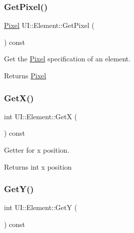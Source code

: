 \mbox{\label{classUI_1_1Element_a7137dc641804612162488d32a147c229}} 
\subsubsection{\texorpdfstring{Get\+Pixel()}{GetPixel()}}
{\footnotesize\ttfamily \hyperlink{classUI_1_1Pixel}{Pixel} U\+I\+::\+Element\+::\+Get\+Pixel (\begin{DoxyParamCaption}{ }\end{DoxyParamCaption}) const}



Get the \hyperlink{classUI_1_1Pixel}{Pixel} specification of an element. 

\begin{DoxyReturn}{Returns}
\hyperlink{classUI_1_1Pixel}{Pixel} 
\end{DoxyReturn}
\mbox{\label{classUI_1_1Element_aa74cd15956eed3d625e57f4f30137165}} 
\subsubsection{\texorpdfstring{Get\+X()}{GetX()}}
{\footnotesize\ttfamily int U\+I\+::\+Element\+::\+GetX (\begin{DoxyParamCaption}{ }\end{DoxyParamCaption}) const}



Getter for x position. 

\begin{DoxyReturn}{Returns}
int x position 
\end{DoxyReturn}
\mbox{\label{classUI_1_1Element_a9f205e4c3ad7f35cf4a10b54a9dc858c}} 
\subsubsection{\texorpdfstring{Get\+Y()}{GetY()}}
{\footnotesize\ttfamily int U\+I\+::\+Element\+::\+GetY (\begin{DoxyParamCaption}{ }\end{DoxyParamCaption}) const}



